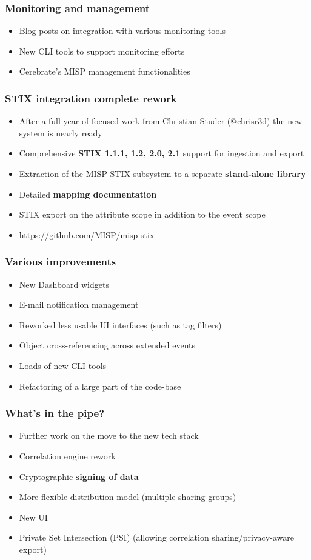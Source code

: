 \begin{frame}
\frametitle{Monitoring and management}
\begin{itemize}
	\item Blog posts on integration with various monitoring tools
        \item New CLI tools to support monitoring efforts
        \item Cerebrate's MISP management functionalities
\end{itemize}
\end{frame}

\begin{frame}
\frametitle{STIX integration complete rework}
\begin{itemize}
	\item After a full year of focused work from Christian Studer (@chrisr3d) the new system is nearly ready
        \item Comprehensive {\bf STIX 1.1.1, 1.2, 2.0, 2.1} support for ingestion and export
        \item Extraction of the MISP-STIX subsystem to a separate {\bf stand-alone library}
        \item Detailed {\bf mapping documentation}
        \item STIX export on the attribute scope in addition to the event scope
        \item \url{https://github.com/MISP/misp-stix}
\end{itemize}
\end{frame}

\begin{frame}
\frametitle{Various improvements}
\begin{itemize}
	\item New Dashboard widgets
        \item E-mail notification management
        \item Reworked less usable UI interfaces (such as tag filters)
        \item Object cross-referencing across extended events
        \item Loads of new CLI tools
        \item Refactoring of a large part of the code-base
\end{itemize}
\end{frame}


\begin{frame}
\frametitle{What's in the pipe?}
\begin{itemize}
	\item Further work on the move to the new tech stack
        \item Correlation engine rework
        \item Cryptographic {\bf signing of data}
        \item More flexible distribution model (multiple sharing groups)
        \item New UI
        \item Private Set Intersection (PSI) (allowing correlation sharing/privacy-aware export)
\end{itemize}
\end{frame}

